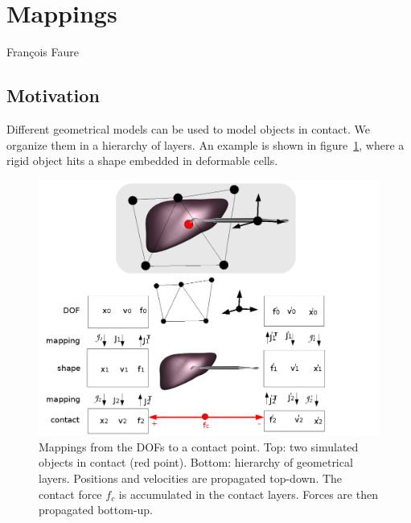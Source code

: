  \section{Mappings} \label{sec:mappings}
Fran\c{c}ois Faure

\newcommand{\JNL}{\ensuremath{\mathcal{J}}}     %
\newcommand{\J}{\ensuremath{J}}     %

\newcommand{\mass}{\ensuremath{M}}             %
\newcommand{\vol}{\ensuremath{\mathcal V}} %
\newcommand{\press}{\ensuremath{\rho}}


\subsection{Motivation} \label{sec:geometryLayers}
Different geometrical models can be used to model objects in contact.
We organize them in a hierarchy of layers. An example is shown in figure~\ref{fig:hierarchy}, where a rigid object hits a shape embedded in deformable cells.

\begin{figure}
 \centering
 \includegraphics[width=\linewidth]{mappings.png}
 \caption{Mappings from the DOFs to a contact point. Top: two simulated objects in contact (red point). Bottom: hierarchy of geometrical layers. Positions and velocities are propagated top-down. The contact force $f_c$ is accumulated in the contact layers. Forces are then propagated bottom-up.
}
 \label{fig:hierarchy}
\end{figure}


